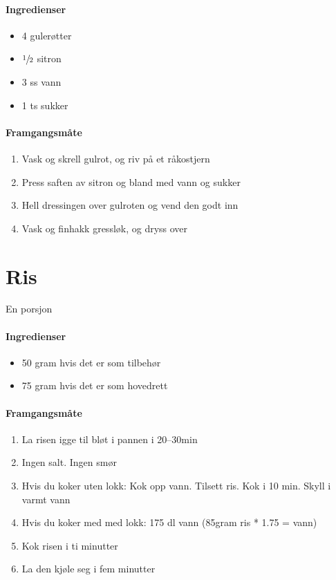 \documentclass[12pt,a4paper]{book}
\begin{document}
\paragraph{Ingredienser}
\begin{itemize}[noitemsep]
	\item 4 gulerøtter
	\item $\sfrac{1}{2}$  sitron
	\item 3 ss vann
	\item 1 ts sukker
\end{itemize}

\paragraph{Framgangsmåte}
\begin{enumerate}[noitemsep]
	\item Vask og skrell gulrot, og riv på et råkostjern
	\item Press saften av sitron og bland med vann og sukker
	\item Hell dressingen over gulroten og vend den godt inn
	\item Vask og finhakk gressløk, og dryss over
\end{enumerate}
\clearpage{}
\clearpage{}\section{﻿Ris}
\label{ris}
En porsjon

\paragraph{Ingredienser}
\begin{itemize}[noitemsep]
	\item 50 gram hvis det er som tilbehør
	\item 75 gram hvis det er som hovedrett
\end{itemize}

\paragraph{Framgangsmåte}
\begin{enumerate}[noitemsep]
	\item La risen igge til bløt i pannen i 20--30min
	\item Ingen salt. Ingen smør
	\item Hvis du koker uten lokk: Kok opp vann. Tilsett ris. Kok i 10 min. Skyll i varmt vann
	\item Hvis du koker med med lokk: 175 dl vann (85gram ris * 1.75 = vann)
	\item Kok risen i ti minutter
	\item La den kjøle seg i fem minutter
\end{enumerate}
\end{document}
